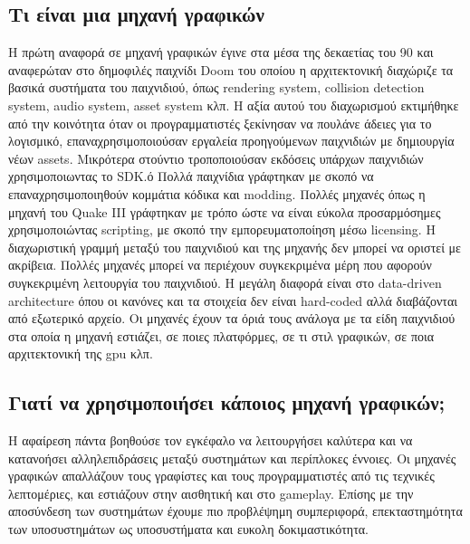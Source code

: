 	\subsection {Τι είναι μια μηχανή γραφικών}
	Η πρώτη αναφορά σε μηχανή γραφικών έγινε στα μέσα της δεκαετίας του 90 και αναφερώταν στο δημοφιλές παιχνίδι Doom του οποίου η αρχιτεκτονική διαχώριζε τα βασικά συστήματα του παιχνιδιού, όπως rendering system, collision detection system, audio system, asset system κλπ. Η αξία αυτού του διαχωρισμού εκτιμήθηκε από την κοινότητα όταν οι προγραμματιστές ξεκίνησαν να πουλάνε άδειες για το λογισμικό, επαναχρησιμοποιούσαν εργαλεία προηγούμενων παιχνιδιών με δημιουργία νέων assets. Μικρότερα στούντιο τροποποιούσαν εκδόσεις υπάρχων παιχνιδιών χρησιμοποιωντας το SDK.ό
	Πολλά παιχνίδια γράφτηκαν με σκοπό να επαναχρησιμοποιηθούν κομμάτια κόδικα και modding. Πολλές μηχανές όπως η μηχανή του Quake III γράφτηκαν με τρόπο ώστε να είναι εύκολα προσαρμόσημες χρησιμοποιώντας scripting, με σκοπό την εμπορευματοποίηση μέσω licensing.
	Η διαχωριστική γραμμή μεταξύ του παιχνιδιού και της μηχανής δεν μπορεί να οριστεί με ακρίβεια. Πολλές μηχανές μπορεί να περιέχουν συγκεκριμένα μέρη που αφορούν συγκεκριμένη λειτουργία του παιχνιδιού. Η μεγάλη διαφορά είναι στο data-driven architecture όπου οι κανόνες και τα στοιχεία δεν είναι hard-coded αλλά διαβάζονται από εξωτερικό αρχείο.
	Οι μηχανές έχουν τα όριά τους ανάλογα με τα είδη παιχνιδιού στα οποία η μηχανή εστιάζει, σε ποιες πλατφόρμες, σε τι στιλ γραφικών, σε ποια αρχιτεκτονική της gpu κλπ. 
	
	\subsection{Γιατί να χρησιμοποιήσει κάποιος μηχανή γραφικών;}	
	Η αφαίρεση πάντα βοηθούσε τον εγκέφαλο να λειτουργήσει καλύτερα και να κατανοήσει αλληλεπιδράσεις μεταξύ συστημάτων και περίπλοκες έννοιες. Οι μηχανές γραφικών απαλλάζουν τους γραφίστες και τους προγραμματιστές από τις τεχνικές λεπτομέριες, και εστιάζουν στην αισθητική και στο gameplay. Επίσης με την αποσύνδεση των συστημάτων έχουμε πιο προβλέψημη συμπεριφορά, επεκταστημότητα των υποσυστημάτων ως υποσυστήματα και ευκολη δοκιμαστικότητα.
	
